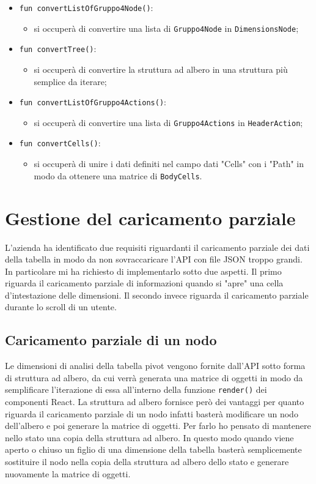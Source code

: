 \begin{itemize}
	\item \verb|fun convertListOfGruppo4Node()|:
	\begin{itemize}
		\item si occuperà di convertire una lista di \verb|Gruppo4Node| in \verb|DimensionsNode|;
	\end{itemize}

	\item \verb|fun convertTree()|:
	\begin{itemize}
		\item si occuperà di convertire la struttura ad albero in una struttura più semplice da iterare;
	\end{itemize}
	
	\item \verb|fun convertListOfGruppo4Actions()|:
	\begin{itemize}
		\item si occuperà di convertire una lista di \verb|Gruppo4Actions| in \verb|HeaderAction|;
	\end{itemize}

	\item \verb|fun convertCells()|:
	\begin{itemize}
		\item si occuperà di unire i dati definiti nel campo dati "Cells" con i "Path" in modo da ottenere una matrice di \verb|BodyCells|.
	\end{itemize}
\end{itemize}

\section{Gestione del caricamento parziale}
L'azienda ha identificato due requisiti riguardanti il caricamento parziale dei dati della tabella in modo da non sovraccaricare l'API con file JSON troppo grandi. In particolare mi ha richiesto di implementarlo sotto due aspetti. Il primo riguarda il caricamento parziale di informazioni quando si "apre" una cella d'intestazione delle dimensioni. Il secondo invece riguarda il caricamento parziale durante lo scroll di un utente.

\subsection*{Caricamento parziale di un nodo}
Le dimensioni di analisi della tabella pivot vengono fornite dall'API sotto forma di struttura ad albero, da cui verrà generata una matrice di oggetti in modo da semplificare l'iterazione di essa all'interno della funzione \verb|render()| dei componenti React. La struttura ad albero fornisce però dei vantaggi per quanto riguarda il caricamento parziale di un nodo infatti basterà modificare un nodo dell'albero e poi generare la matrice di oggetti. Per farlo ho pensato di mantenere nello stato una copia della struttura ad albero. In questo modo quando viene aperto o chiuso un figlio di una dimensione della tabella basterà semplicemente sostituire il nodo nella copia della struttura ad albero dello stato e generare nuovamente la matrice di oggetti.

